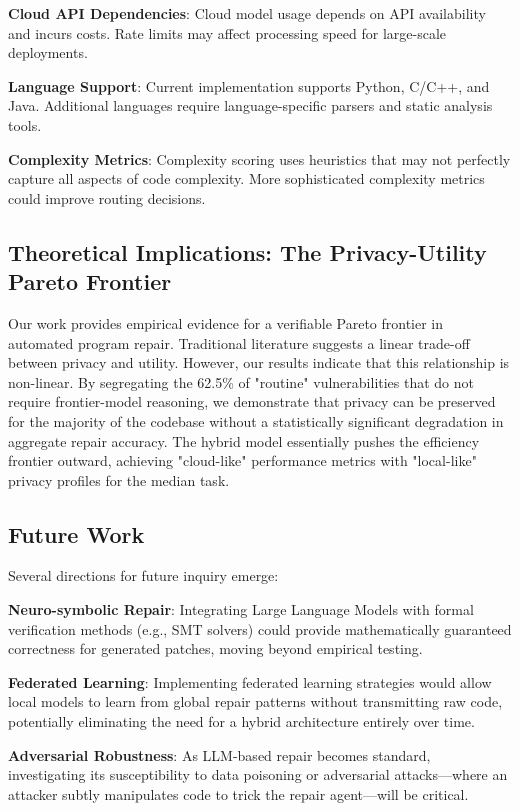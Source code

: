 \documentclass[conference]{IEEEtran}
\begin{document}
\textbf{Cloud API Dependencies}: Cloud model usage depends on API availability and incurs costs. Rate limits may affect processing speed for large-scale deployments.

\textbf{Language Support}: Current implementation supports Python, C/C++, and Java. Additional languages require language-specific parsers and static analysis tools.

\textbf{Complexity Metrics}: Complexity scoring uses heuristics that may not perfectly capture all aspects of code complexity. More sophisticated complexity metrics could improve routing decisions.

\subsection{Theoretical Implications: The Privacy-Utility Pareto Frontier}
Our work provides empirical evidence for a verifiable Pareto frontier in automated program repair. Traditional literature suggests a linear trade-off between privacy and utility. However, our results indicate that this relationship is non-linear. By segregating the 62.5\% of "routine" vulnerabilities that do not require frontier-model reasoning, we demonstrate that privacy can be preserved for the majority of the codebase without a statistically significant degradation in aggregate repair accuracy. The hybrid model essentially pushes the efficiency frontier outward, achieving "cloud-like" performance metrics with "local-like" privacy profiles for the median task.

\subsection{Future Work}
Several directions for future inquiry emerge:

\textbf{Neuro-symbolic Repair}: Integrating Large Language Models with formal verification methods (e.g., SMT solvers) could provide mathematically guaranteed correctness for generated patches, moving beyond empirical testing.

\textbf{Federated Learning}: Implementing federated learning strategies would allow local models to learn from global repair patterns without transmitting raw code, potentially eliminating the need for a hybrid architecture entirely over time.

\textbf{Adversarial Robustness}: As LLM-based repair becomes standard, investigating its susceptibility to data poisoning or adversarial attacks—where an attacker subtly manipulates code to trick the repair agent—will be critical.
\end{document}
